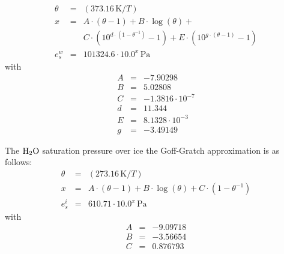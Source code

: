 \begin{eqnarray}
  \theta &=& (373.16\,\mbox{K} / T) \\
%
  x      &=& A \cdot \left(\theta -1 \right) + 
             B \cdot \log{(\theta)} + \nonumber\\ 
         &&  C \cdot \left( 10^{d\cdot (1- \theta^{-1})} -1 \right) +  
             E \cdot \left( 10^{g\cdot (\theta-1)} -1 \right) \\ 
%
  e^w_s  &=& 101324.6 \cdot 10.0^x\,\mbox{Pa} 
\end{eqnarray}
with
\begin{eqnarray}
 A &=& -7.90298 \nonumber \\
 B &=& 5.02808  \nonumber \\
 C &=& -1.3816 \cdot 10^{-7} \nonumber \\
 d &=& 11.344 \nonumber \\
 E &=& 8.1328 \cdot 10^{-3} \nonumber \\
 g &=& -3.49149 \nonumber
\end{eqnarray}


The $\mbox{H}_2\mbox{O}$ saturation pressure over ice the Goff-Gratch 
approximation \citep{liebeetal:93} is as follows:
\begin{eqnarray}
  \theta &=& (273.16\,\mbox{K} / T) \\
%
  x      &=& A \cdot \left(\theta -1 \right) + 
             B \cdot \log{(\theta)} + 
             C \cdot \left( 1- \theta^{-1} \right) \\ 
%
  e^i_s  &=& 610.71 \cdot 10.0^x\,\mbox{Pa} 
\end{eqnarray}
with
\begin{eqnarray}
 A &=& -9.09718  \nonumber \\
 B &=& -3.56654  \nonumber \\
 C &=&  0.876793 \nonumber
\end{eqnarray}



